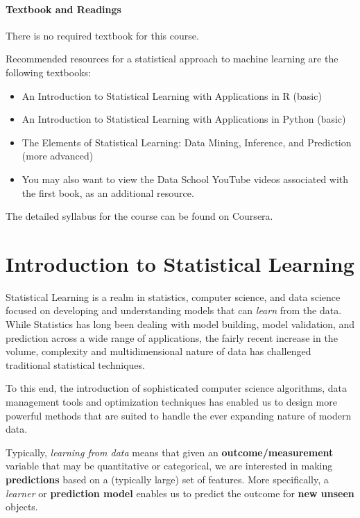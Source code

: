 \documentclass[
]{book}
\providecommand{\tightlist}{%
  \setlength{\itemsep}{0pt}\setlength{\parskip}{0pt}}
\begin{document}
\subsubsection*{\texorpdfstring{ Textbook and Readings }{ Textbook and Readings }}\label{textbook-and-readings}

There is no required textbook for this course.

Recommended resources for a statistical approach to machine learning are the following textbooks:

\begin{itemize}
\tightlist
\item
  An Introduction to Statistical Learning with Applications in R (basic)
\item
  An Introduction to Statistical Learning with Applications in Python (basic)
\item
  The Elements of Statistical Learning: Data Mining, Inference, and Prediction (more advanced)
\item
  You may also want to view the Data School YouTube videos associated with the first book, as an additional resource.
\end{itemize}

The detailed syllabus for the course can be found on Coursera.

\chapter{Introduction to Statistical Learning}\label{introduction-to-statistical-learning}

Statistical Learning is a realm in statistics, computer science, and data science focused on developing and understanding models that can \emph{learn} from the data. While Statistics has long been dealing with model building, model validation, and prediction across a wide range of applications, the fairly recent increase in the volume, complexity and multidimensional nature of data has challenged traditional statistical techniques.

To this end, the introduction of sophisticated computer science algorithms, data management tools and optimization techniques has enabled us to design more powerful methods that are suited to handle the ever expanding nature of modern data.

Typically, \emph{learning from data} means that given an \textbf{outcome/measurement} variable that may be quantitative or categorical, we are interested in making \textbf{predictions} based on a (typically large) set of features. More specifically, a \emph{learner} or \textbf{prediction model} enables us to predict the outcome for \textbf{new unseen} objects.
\end{document}
